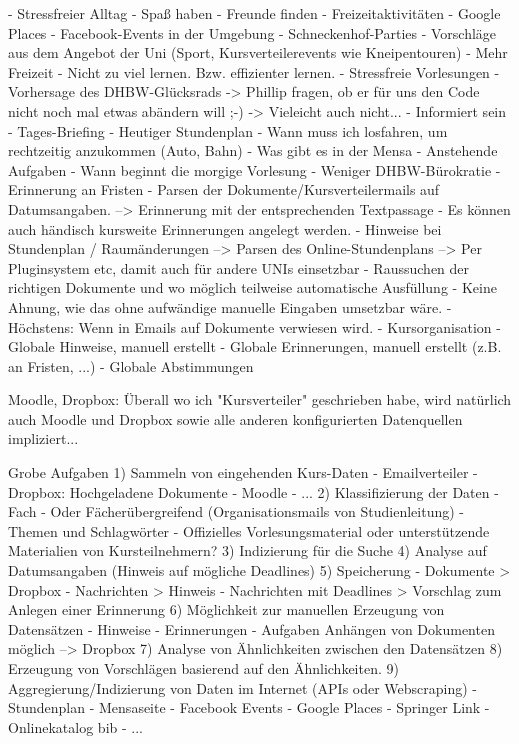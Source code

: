     - Stressfreier Alltag
        - Spaß haben
            - Freunde finden
            - Freizeitaktivitäten
                - Google Places
                - Facebook-Events in der Umgebung
                - Schneckenhof-Parties
                - Vorschläge aus dem Angebot der Uni (Sport, Kursverteilerevents wie Kneipentouren)
            - Mehr Freizeit
                - Nicht zu viel lernen. Bzw. effizienter lernen.
        - Stressfreie Vorlesungen
            - Vorhersage des DHBW-Glücksrads
                -> Phillip fragen, ob er für uns den Code nicht noch mal etwas abändern will ;-)
                -> Vieleicht auch nicht...
        - Informiert sein
            - Tages-Briefing
                - Heutiger Stundenplan
                - Wann muss ich losfahren, um rechtzeitig anzukommen (Auto, Bahn)
                - Was gibt es in der Mensa
                - Anstehende Aufgaben
                - Wann beginnt die morgige Vorlesung
        - Weniger DHBW-Bürokratie
            - Erinnerung an Fristen
                - Parsen der Dokumente/Kursverteilermails auf Datumsangaben. --> Erinnerung mit der entsprechenden Textpassage
                - Es können auch händisch kursweite Erinnerungen angelegt werden.
            - Hinweise bei Stundenplan / Raumänderungen
                --> Parsen des Online-Stundenplans
                --> Per Pluginsystem etc, damit auch für andere UNIs einsetzbar
            - Raussuchen der richtigen Dokumente und wo möglich teilweise automatische Ausfüllung
                - Keine Ahnung, wie das ohne aufwändige manuelle Eingaben umsetzbar wäre.
                - Höchstens: Wenn in Emails auf Dokumente verwiesen wird.
        - Kursorganisation
            - Globale Hinweise, manuell erstellt
            - Globale Erinnerungen, manuell erstellt (z.B. an Fristen, ...)
            - Globale Abstimmungen



Moodle, Dropbox:
    Überall wo ich "Kursverteiler" geschrieben habe, wird natürlich auch Moodle und Dropbox sowie alle anderen konfigurierten Datenquellen impliziert...

Grobe Aufgaben
    1) Sammeln von eingehenden Kurs-Daten
        - Emailverteiler
        - Dropbox: Hochgeladene Dokumente
        - Moodle
        - ...
    2) Klassifizierung der Daten
        - Fach
        - Oder Fächerübergreifend (Organisationsmails von Studienleitung)
        - Themen und Schlagwörter
        - Offizielles Vorlesungsmaterial oder unterstützende Materialien von Kursteilnehmern?
    3) Indizierung für die Suche
    4) Analyse auf Datumsangaben (Hinweis auf mögliche Deadlines)
    5) Speicherung
        - Dokumente > Dropbox
        - Nachrichten > Hinweis
        - Nachrichten mit Deadlines > Vorschlag zum Anlegen einer Erinnerung
    6) Möglichkeit zur manuellen Erzeugung von Datensätzen
        - Hinweise
        - Erinnerungen
        - Aufgaben
        Anhängen von Dokumenten möglich --> Dropbox
    7) Analyse von Ähnlichkeiten zwischen den Datensätzen
    8) Erzeugung von Vorschlägen basierend auf den Ähnlichkeiten.
    9) Aggregierung/Indizierung von Daten im Internet (APIs oder Webscraping)
        - Stundenplan
        - Mensaseite
        - Facebook Events 
        - Google Places
        - Springer Link
        - Onlinekatalog bib
        - ...



